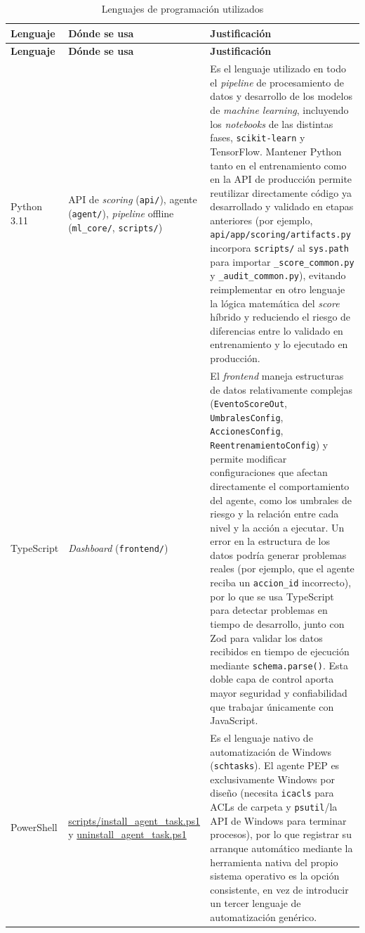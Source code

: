 \begin{longtable}{p{2.4cm}p{4.4cm}p{7.8cm}}
	\caption{Lenguajes de programación utilizados}
	\label{tab:lenguajes}\\
	\hline
	\textbf{Lenguaje} & \textbf{Dónde se usa} & \textbf{Justificación} \\
	\hline
	\endfirsthead
	\hline
	\textbf{Lenguaje} & \textbf{Dónde se usa} & \textbf{Justificación} \\
	\hline
	\endhead
	Python 3.11 & API de \emph{scoring} (\texttt{api/}), agente (\texttt{agent/}), \emph{pipeline} offline (\texttt{ml\_core/}, \texttt{scripts/}) & Es el lenguaje utilizado en todo el \emph{pipeline} de procesamiento de datos y desarrollo de los modelos de \emph{machine learning}, incluyendo los \emph{notebooks} de las distintas fases, \texttt{scikit-learn} y TensorFlow. Mantener Python tanto en el entrenamiento como en la API de producción permite reutilizar directamente código ya desarrollado y validado en etapas anteriores (por ejemplo, \texttt{api/app/scoring/artifacts.py} incorpora \texttt{scripts/} al \texttt{sys.path} para importar \texttt{\_score\_common.py} y \texttt{\_audit\_common.py}), evitando reimplementar en otro lenguaje la lógica matemática del \emph{score} híbrido y reduciendo el riesgo de diferencias entre lo validado en entrenamiento y lo ejecutado en producción. \\
	\hline
	TypeScript & \emph{Dashboard} (\texttt{frontend/}) & El \emph{frontend} maneja estructuras de datos relativamente complejas (\texttt{EventoScoreOut}, \texttt{UmbralesConfig}, \texttt{AccionesConfig}, \texttt{ReentrenamientoConfig}) y permite modificar configuraciones que afectan directamente el comportamiento del agente, como los umbrales de riesgo y la relación entre cada nivel y la acción a ejecutar. Un error en la estructura de los datos podría generar problemas reales (por ejemplo, que el agente reciba un \texttt{accion\_id} incorrecto), por lo que se usa TypeScript para detectar problemas en tiempo de desarrollo, junto con Zod para validar los datos recibidos en tiempo de ejecución mediante \texttt{schema.parse()}. Esta doble capa de control aporta mayor seguridad y confiabilidad que trabajar únicamente con JavaScript. \\
	\hline
	PowerShell & \url{scripts/install_agent_task.ps1} y \url{uninstall_agent_task.ps1} & Es el lenguaje nativo de automatización de Windows (\texttt{schtasks}). El agente PEP es exclusivamente Windows por diseño (necesita \texttt{icacls} para ACLs de carpeta y \texttt{psutil}/la API de Windows para terminar procesos), por lo que registrar su arranque automático mediante la herramienta nativa del propio sistema operativo es la opción consistente, en vez de introducir un tercer lenguaje de automatización genérico. \\
	\hline
\end{longtable}

